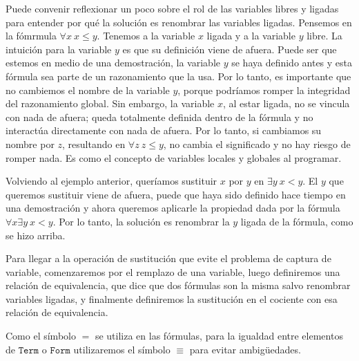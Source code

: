 \documentclass[a4paper, 12pt]{report}
\theoremstyle{definition}
\begin{document}
Puede convenir reflexionar un poco sobre el rol de las variables libres y ligadas para entender por qué la solución es renombrar las variables ligadas. Pensemos en la fómrmula $\forall x~ x\leq y$. Tenemos a la variable $x$ ligada y a la variable $y$ libre. La intuición para la variable $y$ es que su definición viene de afuera. Puede ser que estemos en medio de una demostración, la variable $y$ se haya definido antes y esta fórmula sea parte de un razonamiento que la usa. Por lo tanto, es importante que no cambiemos el nombre de la variable $y$, porque podríamos romper la integridad del razonamiento global. Sin embargo, la variable $x$, al estar ligada, no se vincula con nada de afuera; queda totalmente definida dentro de la fórmula y no interactúa directamente con nada de afuera. Por lo tanto, si cambiamos su nombre por $z$, resultando en $\forall z~ z\leq y$, no cambia el significado y no hay riesgo de romper nada. Es como el concepto de variables locales y globales al programar.

Volviendo al ejemplo anterior, queríamos sustituir $x$ por $y$ en $\exists y~ x<y$. El $y$ que queremos sustituir viene de afuera, puede que haya sido definido hace tiempo en una demostración y ahora queremos aplicarle la propiedad dada por la fórmula $\forall x\exists y~ x<y$. Por lo tanto, la solución es renombrar la $y$ ligada de la fórmula, como se hizo arriba.

Para llegar a la operación de sustitución que evite el problema de captura de variable, comenzaremos por el remplazo de una variable, luego definiremos una relación de equivalencia, que dice que dos fórmulas son la misma salvo renombrar variables ligadas, y finalmente definiremos la sustitución en el cociente con esa relación de equivalencia.

Como el símbolo $=$ se utiliza en las fórmulas, para la igualdad entre elementos de $\mathtt{Term}$ o $\mathtt{Form}$ utilizaremos el símbolo $\equiv$ para evitar ambigüedades.
\end{document}
